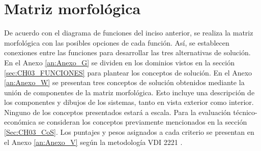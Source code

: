 \section{Matriz morfológica}
De acuerdo con el diagrama de funciones del inciso anterior, se realiza la matriz morfológica con las posibles opciones de cada función. Así, se establecen conexiones entre las funciones para desarrollar las tres alternativas de solución. En el Anexo \ref{an:Anexo_G} se dividen en los dominios vistos en la sección \ref{sec:CH03_FUNCIONES} para plantear los conceptos de solución.
En el Anexo \ref{an:Anexo_W} se presentan tres conceptos de solución obtenidos mediante la unión de componentes de la matriz morfológica. Esto incluye una descripción de los componentes y dibujos de los sistemas, tanto en vista exterior como interior. Ninguno de los conceptos presentados estará a escala.
Para la evaluación técnico-económica se consideran los conceptos previamente mencionados en la sección \ref{Sec:CH03_CoS}. Los puntajes y  pesos asignados a cada criterio se presentan en el Anexo \ref{an:Anexo_V} según la metodología VDI 2221 \autocite{imagen_v}. 